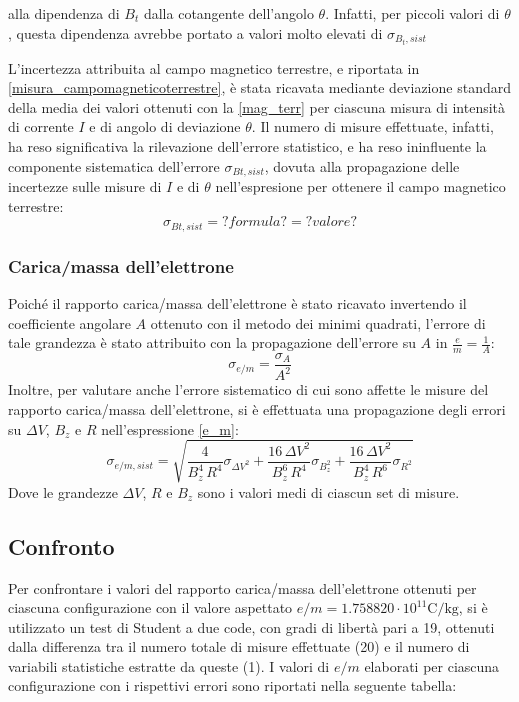 \documentclass[]{article}
\let\oldsubsection\subsection%
\renewcommand{\subsection}{%
	\renewcommand{\theequation}{\thesubsection.\arabic{equation}}%
	\oldsubsection}%
\begin{document}
    alla dipendenza di $B_t$ dalla cotangente dell'angolo $\theta$. Infatti, per piccoli valori di $\theta$, questa dipendenza avrebbe portato a valori molto elevati di $\sigma_{B_t,sist}$

    L'incertezza attribuita al campo magnetico terrestre, e riportata in \ref{misura_campomagneticoterrestre}, è stata ricavata mediante deviazione standard della media dei valori ottenuti con la \ref{mag_terr} per ciascuna misura di intensità di corrente $I$ e di angolo di deviazione $\theta$. Il numero di misure effettuate, infatti, ha reso significativa la rilevazione dell'errore statistico, e ha reso ininfluente la componente sistematica dell'errore $\sigma _{Bt, sist}$, dovuta alla propagazione delle incertezze sulle misure di $I$ e di $\theta$ nell'espresione per ottenere il campo magnetico terrestre:
    \begin{equation}
        \label{sigma_Bt_stat}
        \sigma _{Bt, sist} = ? formula ? = ? valore ? 
    \end{equation}

    \label{par:sigma_campo_magnetico_terrestre}

    \subsubsection{Carica/massa dell'elettrone}
    Poiché il rapporto carica/massa dell'elettrone è stato ricavato invertendo il coefficiente angolare $A$ ottenuto con il metodo dei minimi quadrati, l'errore di tale grandezza è stato attribuito con la propagazione dell'errore su $A$ in $\frac{e}{m}=\frac{1}{A}$:
    \begin{equation}
        \label{sigma_e/m}
        \sigma _{e/m} = \frac{\sigma_A}{A^2} 
    \end{equation}
    Inoltre, per valutare anche l'errore sistematico di cui sono affette le misure del rapporto carica/massa dell'elettrone, si è effettuata una propagazione degli errori su $\Delta V$, $B_z$ e $R$ nell'espressione \ref{e_m}:
    \begin{equation}
        \label{sigma_e/m_sist}
        \sigma _{e/m,sist} = \sqrt{ \frac{4}{B_z^4 \, R^4} \sigma_{\Delta V ^2} + \frac{16 \, \Delta V ^2}{B_z^6 \, R^4} \sigma_{B_z ^2} + \frac{16 \, \Delta V ^2}{B_z^4 \, R^6} \sigma_{R ^2}  }  
    \end{equation}
    Dove le grandezze $\Delta V$, $R$ e $B_z$ sono i valori medi di ciascun set di misure.

    \subsection{Confronto}
    Per confrontare i valori del rapporto carica/massa dell'elettrone ottenuti per ciascuna configurazione con il valore aspettato
    $e/m = 1.758820 \cdot 10^{11}\text{C/kg}$, si è utilizzato un test di Student a due code, con gradi di libertà pari a 19, ottenuti dalla differenza tra il numero totale di misure effettuate (20) e il numero di variabili statistiche estratte da queste (1).
    I valori di $e/m$ elaborati per ciascuna configurazione con i rispettivi errori sono riportati nella seguente
    tabella:
\end{document}
